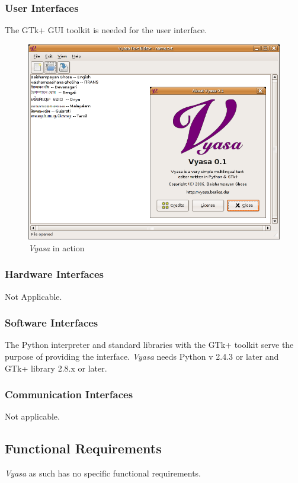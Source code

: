 \documentclass[12pt,a4paper]{article}
\newcommand{\VS}{\textit{Vyasa}}
\begin{document}
\subsubsection{User Interfaces}
The GTk+ GUI toolkit is needed for the user interface.
\begin{figure}[ht]
\centering
\includegraphics[width=5.5in]{vyasa-screenshot.png}
\caption{\VS{} in action}
\end{figure}

\subsubsection{Hardware Interfaces}
Not Applicable.

\subsubsection{Software Interfaces}
The Python interpreter and standard libraries with the GTk+ toolkit
serve the purpose of providing the interface.
\VS{} needs Python v 2.4.3 or later and GTk+ library 2.8.x or later.

\subsubsection{Communication Interfaces}
Not applicable.

\subsection{Functional Requirements}
\VS{} as such has no specific functional requirements.
\end{document}
